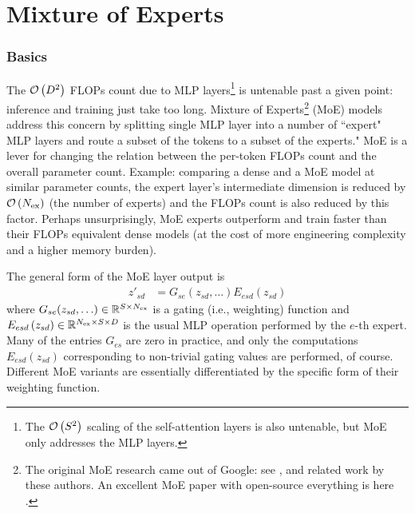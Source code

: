 \part{Mixture of Experts}

\section{Basics}

The $ \mathcal{O} \left(  D ^{ 2 } \right)  $ FLOPs count due to MLP layers\footnote{The $ \mathcal{O} \left( S
^{ 2 } \right)  $ scaling of the self-attention layers is also untenable, but MoE only addresses the
MLP layers.} is untenable past a given point: inference and training just take too long.  Mixture of
Experts\footnote{The original MoE research came out of Google: see
    \cite{fedus2022switchtransformersscalingtrillion},
    \cite{shazeer2017outrageouslylargeneuralnetworks} and related work by these authors. An
excellent MoE paper with open-source everything is here
\cite{muennighoff2024olmoeopenmixtureofexpertslanguage}. } (MoE) models address this concern by
splitting single MLP layer into a number of ``expert" MLP layers and route a subset of the tokens to
a subset of the experts." MoE is a lever for changing the relation between the per-token FLOPs count
and the overall parameter count. Example: comparing a dense and a MoE model at similar parameter counts, the
expert layer's intermediate dimension is reduced by $ \mathcal{O} \left( N _{ {\rm ex} } \right)  $ (the
number of experts) and the FLOPs count is also reduced by this factor. Perhaps unsurprisingly, MoE
experts outperform and train faster than their FLOPs equivalent dense models (at the cost of more
engineering complexity and a higher memory burden).

The general form of the MoE layer output is
\begin{align}
    z' _{ sd } &=G _{ se }(z _{ sd }, \ldots )E _{ esd } \left ( z _{ sd } \right ) \label{eq_general_moe}
\end{align}
where $ G _{ se }(z _{ sd }, \ldots ) \in \mathbb{R} ^{ S \times N _{ {\rm ex}  } } $ is a gating (i.e.,
weighting) function and $ E _{ esd } \left ( z _{ sd } \right ) \in \mathbb{R} ^{ N _{ {\rm ex}
}\times S \times D } $ is the usual MLP operation performed by the $ e $-th expert. Many of the
entries $ G _{ es } $  are zero in practice, and only the computations $ E _{ esd } \left ( z _{ sd
} \right )$ corresponding to non-trivial gating values are performed, of course. Different MoE
variants are essentially differentiated by the specific form of their weighting function.


